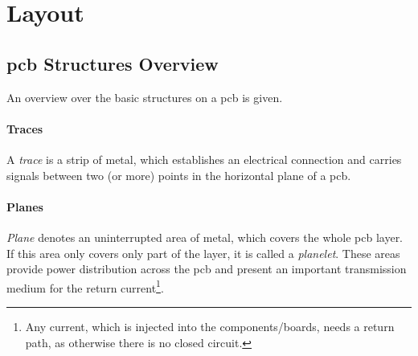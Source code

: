 \section{Layout}


\subsection{\gls{pcb} Structures Overview} \label{ssec:pcb_structs}
An overview over the basic structures on a \gls{pcb} is given.

\paragraph{Traces}
A \textit{trace} is a strip of metal, which establishes an electrical connection and carries signals between two (or more) points in the horizontal plane of a \gls{pcb}. \cite{xilDecouple}


\paragraph{Planes}
\textit{Plane} denotes an uninterrupted area of metal, which covers the whole \gls{pcb} layer. If this area only covers only part of the layer, it is called a \textit{planelet}. These areas provide power distribution across the \gls{pcb} and present an important transmission medium for the return current\footnote{Any current, which is injected into the components/boards, needs a return path, as otherwise there is no closed circuit.}. \cite{xilDecouple}

